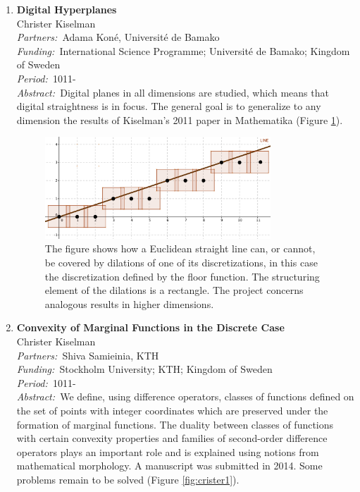 \documentclass[10pt, a4paper]{article}
\newcommand{\aabstract}[1]{\emph{Abstract:~}#1}
\newcommand{\ffunding}[1]{\emph{Funding:~}#1\\}
\newcommand{\ppartners}[1]{\emph{Partners:~}#1\\}
\newcommand{\pperiod}[1]{\emph{Period:~}#1\\}
\begin{document}
{\begin{enumerate}
\newpage

%

\item 
\textbf{Digital Hyperplanes}\\
Christer Kiselman\\
\ppartners{Adama Kon\' e, Universit\' e de Bamako}
\ffunding{International Science Programme; Universit\' e de Bamako; Kingdom of Sweden}
\pperiod{1011-}
\aabstract{Digital planes in all dimensions are studied, which means that digital straightness is in focus. The general goal is to generalize to any dimension the results of Kiselman's 2011 paper in Mathematika (Figure \ref {fig:crister2}).}

\begin{figure}[!htbp]
	\centering
	\includegraphics[width=0.8\textwidth]{figures/research/CoveringUFloor.png}
	\caption{\label{fig:crister2} The figure shows how a Euclidean straight line can, or cannot, be covered by dilations of one of its discretizations, in this case the discretization defined by the floor function.  The structuring element of the dilations is a rectangle.  The project concerns analogous results in higher dimensions.} 
\end{figure}



\item 
\textbf{Convexity of Marginal Functions in the Discrete Case}\\
Christer Kiselman\\
\ppartners{Shiva Samieinia, KTH}
\ffunding{Stockholm University; KTH; Kingdom of Sweden}
\pperiod{1011-}
\aabstract{We define, using difference operators, classes of functions defined on the set of points with integer coordinates which are preserved under the formation of marginal functions. The duality between classes of functions with certain convexity properties and families of second-order difference operators plays an important role and is explained using notions from mathematical morphology. A manuscript was submitted in 2014. Some problems remain to be solved (Figure \ref {fig:crister1}).}


\end{enumerate}}
\end{document}

